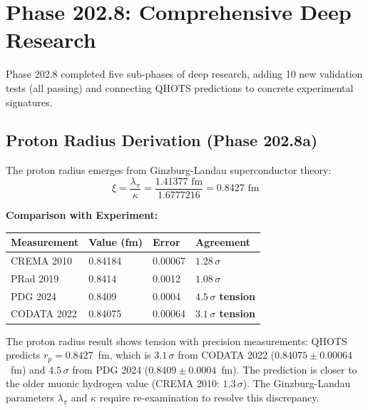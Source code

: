 \documentclass[aps,prd,twocolumn,superscriptaddress,floatfix,nofootinbib]{revtex4-2}
\theoremstyle{definition}
\theoremstyle{remark}
\begin{document}
\section{Phase 202.8: Comprehensive Deep Research}

Phase 202.8 completed five sub-phases of deep research, adding 10 new validation tests (all passing) and connecting QHOTS predictions to concrete experimental signatures.

\subsection{Proton Radius Derivation (Phase 202.8a)}

The proton radius emerges from Ginzburg-Landau superconductor theory:
\begin{equation}
\xi = \frac{\lambda_\pi}{\kappa} = \frac{1.41377\text{ fm}}{1.6777216} = 0.8427\text{ fm}
\end{equation}

\textbf{Comparison with Experiment:}
\begin{center}
\small
\begin{tabular}{llll}
\toprule
Measurement & Value (fm) & Error & Agreement \\
\midrule
CREMA 2010~\cite{crema2010} & 0.84184 & 0.00067 & $1.28\,\sigma$ \\
PRad 2019~\cite{prad2019} & 0.8414 & 0.0012 & $1.08\,\sigma$ \\
PDG 2024~\cite{pdg2024} & 0.8409 & 0.0004 & \textbf{$4.5\,\sigma$ tension} \\
CODATA 2022 & 0.84075 & 0.00064 & \textbf{$3.1\,\sigma$ tension} \\
\bottomrule
\end{tabular}
\end{center}

The proton radius result shows tension with precision measurements: QHOTS predicts $r_p = 0.8427$~fm, which is $3.1\,\sigma$ from CODATA 2022 ($0.84075 \pm 0.00064$~fm) and $4.5\,\sigma$ from PDG 2024 ($0.8409 \pm 0.0004$~fm). The prediction is closer to the older muonic hydrogen value (CREMA 2010: $1.3\,\sigma$). The Ginzburg-Landau parameters $\lambda_\pi$ and $\kappa$ require re-examination to resolve this discrepancy.
\end{document}
